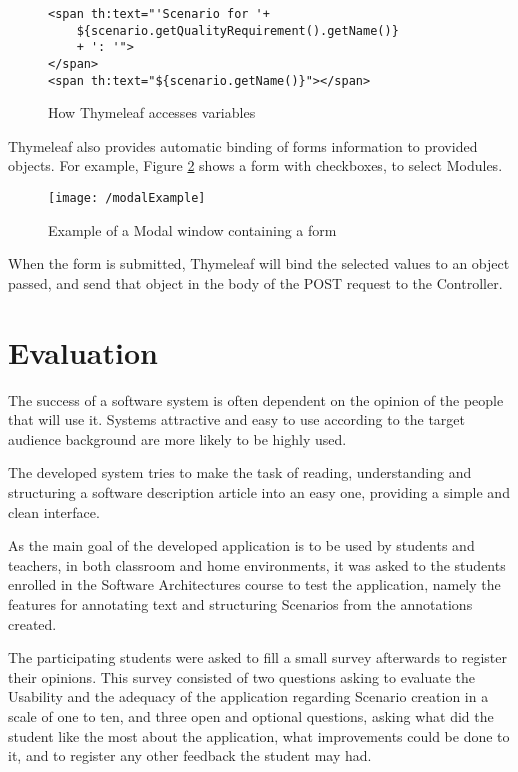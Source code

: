 \documentclass[conference]{IEEEtran}
\begin{document}
\begin{figure}
\lstset{style=customhtml}
\begin{lstlisting}
<span th:text="'Scenario for '+
	${scenario.getQualityRequirement().getName()}
	+ ': '">
</span> 
<span th:text="${scenario.getName()}"></span>
\end{lstlisting}
\caption{How Thymeleaf accesses variables}
\label{figure:viewsCallingMethods}
\end{figure}

Thymeleaf also provides automatic binding of forms information to provided objects. For example, Figure \ref{figure:viewsModalFormExample} shows a form with checkboxes, to select Modules.
\begin{figure}
\centering
\texttt{[image: /modalExample]}
\caption{Example of a Modal window containing a form}
\label{figure:viewsModalFormExample}
\end{figure}

When the form is submitted, Thymeleaf will bind the selected values to an object passed, and send that object in the body of the POST request to the Controller.

\section{Evaluation}
\label{evaluation}

The success of a software system is often dependent on the opinion of the people that will use it. Systems attractive and easy to use according to the target audience background are more likely to be highly used.

The developed system tries to make the task of reading, understanding and structuring a software description article into an easy one, providing a simple and clean interface.

As the main goal of the developed application is to be used by students and teachers, in both classroom and home environments, it was asked to the students enrolled in the Software Architectures course to test the application, namely the features for annotating text and structuring Scenarios from the annotations created.

The participating students were asked to fill a small survey afterwards to register their opinions.
This survey consisted of two questions asking to evaluate the Usability and the adequacy of the application regarding Scenario creation in a scale of one to ten, and three open and optional questions, asking what did the student like the most about the application, what improvements could be done to it, and to register any other feedback the student may had.
\end{document}
